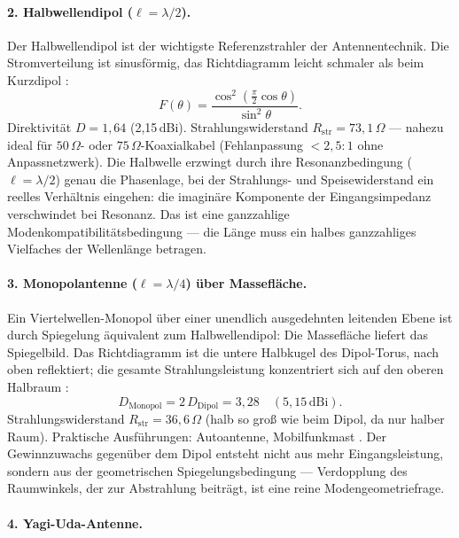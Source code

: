 \paragraph{2. Halbwellendipol ($\ell = \lambda/2$).}

Der Halbwellendipol ist der wichtigste Referenzstrahler der Antennentechnik.
Die Stromverteilung ist sinusförmig, das Richtdiagramm leicht schmaler als
beim Kurzdipol \EM:
\[
  F(\theta) = \frac{\cos^2\!\left(\frac{\pi}{2}\cos\theta\right)}{\sin^2\theta}.
\]
Direktivität $D = 1{,}64$ (2,15\,dBi). Strahlungswiderstand
$R_\mathrm{str} = 73{,}1\,\Omega$ --- nahezu ideal für $50\,\Omega$- oder
$75\,\Omega$-Koaxialkabel (Fehlanpassung $< 2{,}5:1$ ohne Anpassnetzwerk).
Die Halbwelle erzwingt durch ihre Resonanzbedingung ($\ell = \lambda/2$)
genau die Phasenlage, bei der Strahlungs- und Speisewiderstand ein reelles
Verhältnis eingehen: die imaginäre Komponente der Eingangsimpedanz
verschwindet bei Resonanz. Das ist eine ganzzahlige Mo\-den\-kom\-pa\-ti\-bi\-li\-täts\-be\-din\-gung
--- die Länge muss ein halbes ganzzahliges Vielfaches der Wellenlänge betragen.

\paragraph{3. Monopolantenne ($\ell = \lambda/4$) über Massefläche.}

Ein Viertelwellen-Monopol über einer unendlich ausgedehnten leitenden Ebene
ist durch Spiegelung äquivalent zum Halbwellendipol: Die Massefläche liefert
das Spiegelbild. Das Richtdiagramm ist die untere Halbkugel des Dipol-Torus,
nach oben reflektiert; die gesamte Strahlungsleistung konzentriert sich auf
den oberen Halbraum \EM:
\[
  D_\mathrm{Monopol} = 2\,D_\mathrm{Dipol} = 3{,}28 \quad (5{,}15\,\mathrm{dBi}).
\]
Strahlungswiderstand $R_\mathrm{str} = 36{,}6\,\Omega$ (halb so groß wie beim
Dipol, da nur halber Raum). Praktische Ausführungen: Autoantenne, Mobilfunkmast \cite{Balanis2016}.
Der Gewinnzuwachs gegenüber dem Dipol entsteht nicht aus mehr Eingangsleistung,
sondern aus der geometrischen Spiegelungsbedingung --- Verdopplung des Raumwinkels,
der zur Abstrahlung beiträgt, ist eine reine Modengeometriefrage.

\paragraph{4. Yagi-Uda-Antenne.}

